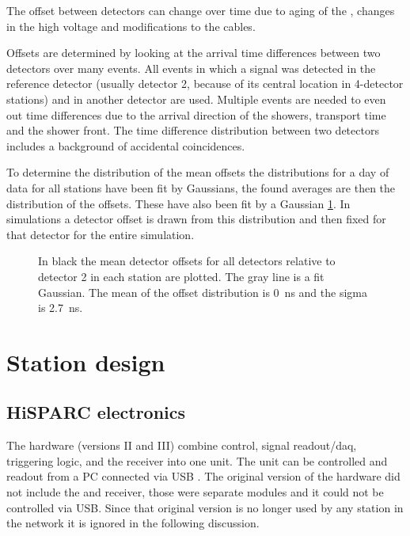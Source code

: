 The offset between detectors can change over time due to aging of the
\pmt, changes in the high voltage and modifications to the cables.

Offsets are determined by looking at the arrival time differences
between two detectors over many events. All events in which a signal was
detected in the reference detector (usually detector 2, because of its
central location in 4-detector stations) and in another detector are
used. Multiple events are needed to even out time differences due to the
arrival direction of the showers, transport time and the shower front.
The time difference distribution between two detectors includes a
background of accidental coincidences.

To determine the distribution of the mean offsets the distributions for
a day of data for all stations have been fit by Gaussians, the found
averages are then the distribution of the offsets. These have also been
fit by a Gaussian \cref{fig:detector_offset_distribution}. In
simulations a detector offset is drawn from this distribution and then
fixed for that detector for the entire simulation.


\begin{figure}
    \centering
    
    \caption{ In black the mean
             detector offsets for all detectors relative to detector 2
             in each station are plotted. The gray line is a fit
             Gaussian. The mean of the offset distribution is
             \SI{0}{\ns} and the sigma is
             \SI{2.7}{\ns}.}
    \label{fig:detector_offset_distribution}
\end{figure}




\section{Station design}
\label{sec:station-design}

\subsection{HiSPARC electronics}

The \hisparc hardware (versions II and III) combine \pmt control, signal readout/daq, triggering logic, and the \gps receiver into one unit. The unit can be controlled and readout from a PC connected via USB \cite{messages}. The original version of the \hisparc hardware did not include the \daq and \gps receiver, those were separate modules and it could not be controlled via USB. Since that original version is no longer used by any station in the network it is ignored in the following discussion.


